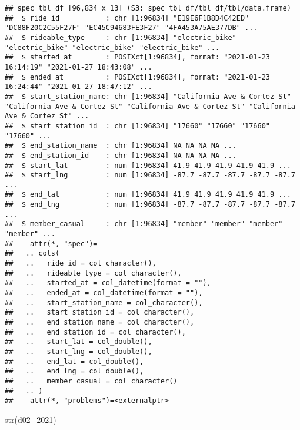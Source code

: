 \documentclass[
]{article}
\newenvironment{Shaded}{\begin{snugshade}}{\end{snugshade}}
\newcommand{\FunctionTok}[1]{\textcolor[rgb]{0.00,0.00,0.00}{#1}}
\newcommand{\NormalTok}[1]{#1}
\begin{document}
\begin{verbatim}
## spec_tbl_df [96,834 x 13] (S3: spec_tbl_df/tbl_df/tbl/data.frame)
##  $ ride_id           : chr [1:96834] "E19E6F1B8D4C42ED" "DC88F20C2C55F27F" "EC45C94683FE3F27" "4FA453A75AE377DB" ...
##  $ rideable_type     : chr [1:96834] "electric_bike" "electric_bike" "electric_bike" "electric_bike" ...
##  $ started_at        : POSIXct[1:96834], format: "2021-01-23 16:14:19" "2021-01-27 18:43:08" ...
##  $ ended_at          : POSIXct[1:96834], format: "2021-01-23 16:24:44" "2021-01-27 18:47:12" ...
##  $ start_station_name: chr [1:96834] "California Ave & Cortez St" "California Ave & Cortez St" "California Ave & Cortez St" "California Ave & Cortez St" ...
##  $ start_station_id  : chr [1:96834] "17660" "17660" "17660" "17660" ...
##  $ end_station_name  : chr [1:96834] NA NA NA NA ...
##  $ end_station_id    : chr [1:96834] NA NA NA NA ...
##  $ start_lat         : num [1:96834] 41.9 41.9 41.9 41.9 41.9 ...
##  $ start_lng         : num [1:96834] -87.7 -87.7 -87.7 -87.7 -87.7 ...
##  $ end_lat           : num [1:96834] 41.9 41.9 41.9 41.9 41.9 ...
##  $ end_lng           : num [1:96834] -87.7 -87.7 -87.7 -87.7 -87.7 ...
##  $ member_casual     : chr [1:96834] "member" "member" "member" "member" ...
##  - attr(*, "spec")=
##   .. cols(
##   ..   ride_id = col_character(),
##   ..   rideable_type = col_character(),
##   ..   started_at = col_datetime(format = ""),
##   ..   ended_at = col_datetime(format = ""),
##   ..   start_station_name = col_character(),
##   ..   start_station_id = col_character(),
##   ..   end_station_name = col_character(),
##   ..   end_station_id = col_character(),
##   ..   start_lat = col_double(),
##   ..   start_lng = col_double(),
##   ..   end_lat = col_double(),
##   ..   end_lng = col_double(),
##   ..   member_casual = col_character()
##   .. )
##  - attr(*, "problems")=<externalptr>
\end{verbatim}

\begin{Shaded}
\begin{Highlighting}[]
\FunctionTok{str}\NormalTok{(d02\_2021)}
\end{Highlighting}
\end{Shaded}
\end{document}
